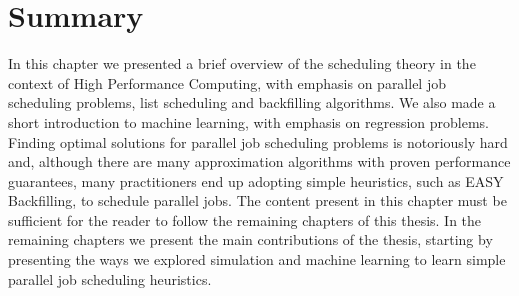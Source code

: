 \section{Summary}


In this chapter we presented a brief overview of the scheduling theory in the context of High Performance Computing, with emphasis on parallel job scheduling problems, list scheduling and backfilling algorithms. We also made a short introduction to machine learning, with emphasis on regression problems. Finding optimal solutions for parallel job scheduling problems is notoriously hard and, although there are many approximation algorithms with proven performance guarantees, many practitioners end up adopting simple heuristics, such as EASY Backfilling, to schedule parallel jobs. The content present in this chapter must be sufficient for the reader to follow the remaining chapters of this thesis. In the remaining chapters we present the main contributions of the thesis, starting by presenting the ways we explored simulation and machine learning to learn simple parallel job scheduling heuristics. 